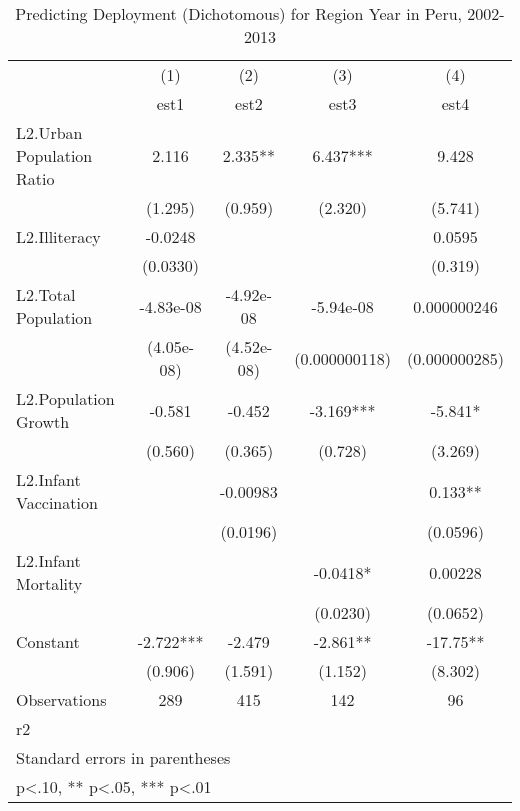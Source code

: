 \documentclass[12pt]{article}
\begin{document}
\begin{table}[htbp]\centering
\def\sym#1{\ifmmode^{#1}\else\(^{#1}\)\fi}
\caption{Predicting Deployment (Dichotomous) for Region Year in Peru, 2002-2013}
\begin{tabular}{l*{4}{c}}
\hline\hline
                    &\multicolumn{1}{c}{(1)}&\multicolumn{1}{c}{(2)}&\multicolumn{1}{c}{(3)}&\multicolumn{1}{c}{(4)}\\
                    &\multicolumn{1}{c}{est1}&\multicolumn{1}{c}{est2}&\multicolumn{1}{c}{est3}&\multicolumn{1}{c}{est4}\\
\hline
L2.Urban Population Ratio&       2.116   &       2.335** &       6.437***&       9.428   \\
                    &     (1.295)   &     (0.959)   &     (2.320)   &     (5.741)   \\
[1em]
L2.Illiteracy       &     -0.0248   &               &               &      0.0595   \\
                    &    (0.0330)   &               &               &     (0.319)   \\
[1em]
L2.Total Population &   -4.83e-08   &   -4.92e-08   &   -5.94e-08   & 0.000000246   \\
                    &  (4.05e-08)   &  (4.52e-08)   &(0.000000118)   &(0.000000285)   \\
[1em]
L2.Population Growth&      -0.581   &      -0.452   &      -3.169***&      -5.841*  \\
                    &     (0.560)   &     (0.365)   &     (0.728)   &     (3.269)   \\
[1em]
L2.Infant Vaccination&               &    -0.00983   &               &       0.133** \\
                    &               &    (0.0196)   &               &    (0.0596)   \\
[1em]
L2.Infant Mortality &               &               &     -0.0418*  &     0.00228   \\
                    &               &               &    (0.0230)   &    (0.0652)   \\
[1em]
Constant            &      -2.722***&      -2.479   &      -2.861** &      -17.75** \\
                    &     (0.906)   &     (1.591)   &     (1.152)   &     (8.302)   \\
\hline
Observations        &         289   &         415   &         142   &          96   \\
r2                  &               &               &               &               \\
\hline\hline
\multicolumn{5}{l}{\footnotesize Standard errors in parentheses}\\
\multicolumn{5}{l}{\footnotesize * p<.10, ** p<.05, *** p<.01}\\
\end{tabular}
\end{table}
\end{document}
